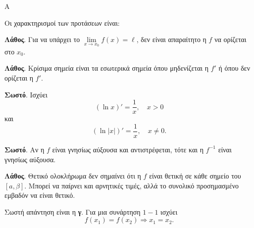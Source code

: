\begin{thema}{Α}
\begin{erwthma}
\item {}

\item {}

\item {}

\item Οι χαρακτηρισμοί των προτάσεων είναι:
\begin{alist}
\item \textbf{Λάθος}. Για να υπάρχει το $\lim\limits_{x\to x_0}f(x)=\ell$, δεν είναι απαραίτητο η $f$ να ορίζεται στο $x_0$.
\item \textbf{Λάθος}. Κρίσιμα σημεία είναι τα εσωτερικά σημεία όπου μηδενίζεται η $f'$ ή όπου δεν ορίζεται η $f'$.
\item \textbf{Σωστό}. Ισχύει
\[ (\ln{x})'=\dfrac{1}{x},\quad x>0 \]
και
\[ (\ln{|x|})'=\dfrac{1}{x},\quad x\neq0. \]
\item \textbf{Σωστό}. Αν η $f$ είναι γνησίως αύξουσα και αντιστρέφεται, τότε και η $f^{-1}$ είναι γνησίως αύξουσα.
\item \textbf{Λάθος}. Θετικό ολοκλήρωμα δεν σημαίνει ότι η $f$ είναι θετική σε κάθε σημείο του $[a,\beta]$. Μπορεί να παίρνει και αρνητικές τιμές, αλλά το συνολικό προσημασμένο εμβαδόν να είναι θετικό.
\end{alist}

\item Σωστή απάντηση είναι η \textbf{γ}. Για μια συνάρτηση $1-1$ ισχύει
\[ f(x_1)=f(x_2)\Rightarrow x_1=x_2. \]
\end{erwthma}
\end{thema}

